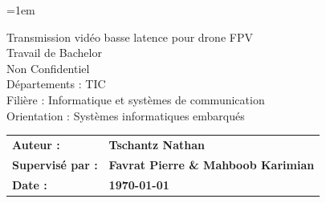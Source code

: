 \documentclass[a4paper,12pt]{article}
\begin{document}
\emergencystretch=1em 

\thispagestyle{firstpage}
\vspace*{2cm}
\begin{center}
    \Huge Transmission vidéo basse latence pour drone FPV\\
    \vspace{0.2cm}
    \Large Travail de Bachelor\\
    \vspace{0.2cm}
    \small Non Confidentiel\\
    \vspace{0.5cm}
    Départements : TIC\\
    \vspace{0.5cm}
    Filière : Informatique et systèmes de communication\\
    \vspace{0.5cm}
    Orientation : Systèmes informatiques embarqués\\
\end{center}

\vspace{9cm}

\renewcommand{\arraystretch}{1.5} %

\begin{flushleft} %
    \begin{tabular}{@{}l l@{}}
        \textbf{Auteur :}      & \textbf{Tschantz Nathan} \\
        \textbf{Supervisé par :}   & \textbf{Favrat Pierre \& Mahboob Karimian } \\
        \textbf{Date :}         & \textbf{\today} \\
    \end{tabular}
\end{flushleft}

\newpage
\thispagestyle{empty}
\mbox{}
\newpage

\pagestyle{otherpages}


\newpage
\thispagestyle{empty}
\mbox{}
\newpage



\newpage
\thispagestyle{empty}
\mbox{}
\newpage



\newpage
\thispagestyle{empty}
\mbox{}
\newpage

\tableofcontents %
\newpage
\listoffigures    %
\newpage
\listoftables     %
\end{document}
